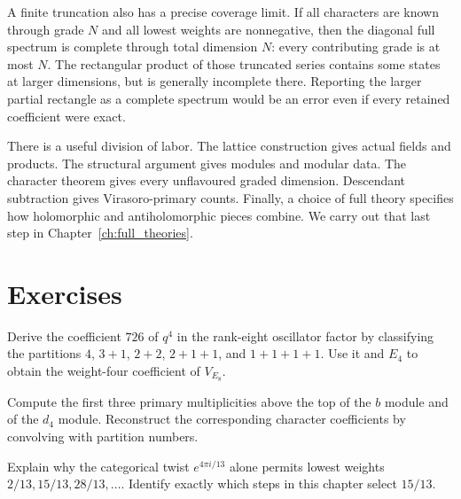 A finite truncation also has a precise coverage limit. If all
characters are known through grade $N$ and all lowest weights are
nonnegative, then the diagonal full spectrum is complete through
total dimension $N$: every contributing grade is at most $N$.
The rectangular product of those truncated series contains some
states at larger dimensions, but is generally incomplete there.
Reporting the larger partial rectangle as a complete spectrum would
be an error even if every retained coefficient were exact.

There is a useful division of labor. The lattice construction gives
actual fields and products. The structural argument gives modules
and modular data. The character theorem gives every unflavoured
graded dimension. Descendant subtraction gives Virasoro-primary
counts. Finally, a choice of full theory specifies how holomorphic
and antiholomorphic pieces combine. We carry out that last step in
Chapter~\ref{ch:full_theories}.

\section{Exercises}

\begin{exercise}\label{ex:char-oscillator}
Derive the coefficient $726$ of $q^4$ in the rank-eight oscillator
factor by classifying the partitions $4$, $3+1$, $2+2$, $2+1+1$,
and $1+1+1+1$. Use it and $E_4$ to obtain the weight-four
coefficient of $V_{E_8}$.

\par\smallskip{}\par
\end{exercise}

\begin{exercise}\label{ex:char-primary}
Compute the first three primary multiplicities above the top of
the $b$ module and of the $d_4$ module. Reconstruct the corresponding
character coefficients by convolving with partition numbers.

\par\smallskip{}\par
\end{exercise}

\begin{exercise}\label{ex:char-pole}
Explain why the categorical twist $e^{4\pi i/13}$ alone permits
lowest weights $2/13,15/13,28/13,\ldots$. Identify exactly which
steps in this chapter select $15/13$.

\par\smallskip{}\par
\end{exercise}

